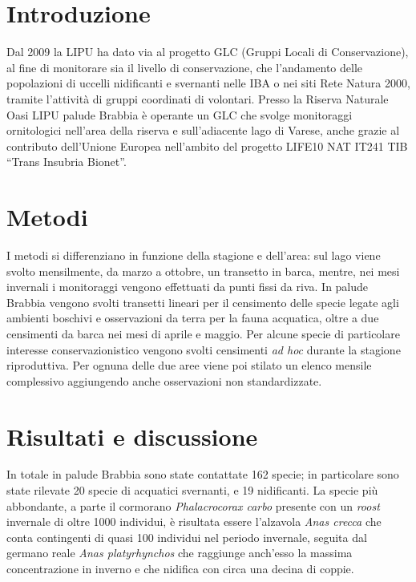 \section*{Introduzione}

Dal 2009 la LIPU ha dato via al progetto GLC (Gruppi Locali di
Conservazione), al fine di monitorare sia il livello di conservazione,
che l{\textquoteright}andamento delle popolazioni di uccelli
nidificanti e svernanti nelle IBA o nei siti Rete Natura 2000, tramite
l{\textquoteright}attivit\`a di gruppi coordinati di volontari. Presso
la Riserva Naturale Oasi LIPU palude Brabbia \`e operante un GLC che
svolge monitoraggi ornitologici nell{\textquoteright}area della riserva
e sull{\textquoteright}adiacente lago di Varese, anche grazie al
contributo dell{\textquoteright}Unione Europea
nell{\textquoteright}ambito del progetto LIFE10 NAT IT241 TIB
{\textquotedblleft}Trans Insubria Bionet{\textquotedblright}. 

\section*{Metodi}

I metodi si differenziano in funzione della stagione e
dell{\textquoteright}area: sul lago viene svolto mensilmente, da marzo
a ottobre, un transetto in barca, mentre, nei mesi invernali i
monitoraggi vengono effettuati da punti fissi da riva. In palude
Brabbia vengono svolti transetti lineari per il censimento delle specie
legate agli ambienti boschivi e osservazioni da terra per la fauna
acquatica, oltre a due censimenti da barca nei mesi di aprile e maggio.
Per alcune specie di particolare interesse conservazionistico vengono
svolti censimenti \textit{ad hoc} durante la stagione riproduttiva. Per
ognuna delle due aree viene poi stilato un elenco mensile complessivo
aggiungendo anche osservazioni non standardizzate. 

\section*{Risultati e discussione}

In totale in palude Brabbia sono state contattate 162 specie; in
particolare sono state rilevate 20 specie di acquatici svernanti, e 19
nidificanti. La specie pi\`u abbondante, a parte il cormorano
\textit{Phalacrocorax carbo} presente con un \textit{roost} invernale
di oltre 1000 individui, \`e risultata essere
l{\textquoteright}alzavola \textit{Anas crecca} che conta contingenti
di quasi 100 individui nel periodo invernale, seguita dal germano reale
\textit{Anas platyrhynchos} che raggiunge anch{\textquoteright}esso la
massima concentrazione in inverno e che nidifica con circa una decina
di coppie. 

